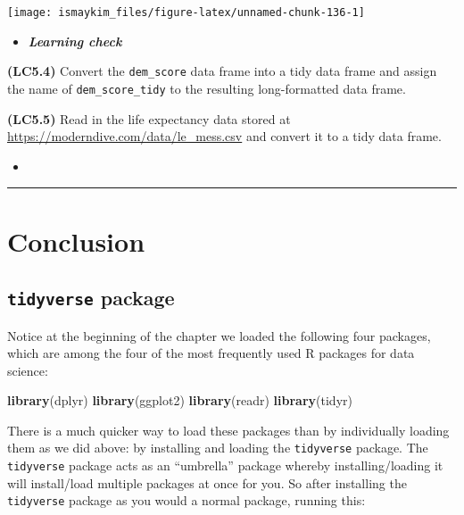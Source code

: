 \documentclass[12pt, krantz2,]{krantz}
\makeatletter
\newenvironment{Shaded}{\begin{snugshade}}{\end{snugshade}}
\newcommand{\KeywordTok}[1]{\textcolor[rgb]{0.27,0.27,0.27}{\textbf{#1}}}
\newcommand{\NormalTok}[1]{#1}
\newenvironment{kframe}{%
\medskip{}
\setlength{\fboxsep}{.8em}
 \def\at@end@of@kframe{}%
 \ifinner\ifhmode%
  \def\at@end@of@kframe{\end{minipage}}%
  \begin{minipage}{\columnwidth}%
 \fi\fi%
 \def\FrameCommand##1{\hskip\@totalleftmargin \hskip-\fboxsep
 \colorbox{shadecolor}{##1}\hskip-\fboxsep
     \hskip-\linewidth \hskip-\@totalleftmargin \hskip\columnwidth}%
 \MakeFramed {\advance\hsize-\width
   \@totalleftmargin\z@ \linewidth\hsize
   \@setminipage}}%
 {\par\unskip\endMakeFramed%
 \at@end@of@kframe}
\renewenvironment{Shaded}{\begin{kframe}}{\end{kframe}}
\newenvironment{rmdblock}[1]
  {\begin{shaded*}
  \begin{itemize}
  \renewcommand{\labelitemi}{
    \raisebox{-.7\height}[0pt][0pt]{
    }
  }
  \item
  }
  {
  \end{itemize}
  \end{shaded*}
  }
\newenvironment{learncheck}
  {\begin{rmdblock}{warning}}
  {\end{rmdblock}}
\makeatother
\begin{document}
\begin{center}\texttt{[image: ismaykim\_files/figure-latex/unnamed-chunk-136-1]} \end{center}

\begin{learncheck}
\textbf{\emph{Learning check}}
\end{learncheck}

\textbf{(LC5.4)} Convert the \texttt{dem\_score} data frame into
a tidy data frame and assign the name of \texttt{dem\_score\_tidy} to the resulting long-formatted data frame.

\textbf{(LC5.5)} Read in the life expectancy data stored at \url{https://moderndive.com/data/le_mess.csv} and convert it to a tidy data frame.

\begin{learncheck}

\end{learncheck}

\begin{center}\rule{0.5\linewidth}{\linethickness}\end{center}

\hypertarget{conclusion-3}{%
\section{Conclusion}\label{conclusion-3}}

\hypertarget{tidyverse-package}{%
\subsection{\texorpdfstring{\texttt{tidyverse} package}{tidyverse package}}\label{tidyverse-package}}

Notice at the beginning of the chapter we loaded the following four packages, which are among the four of the most frequently used R packages for data science:

\begin{Shaded}
\begin{Highlighting}[]
\KeywordTok{library}\NormalTok{(dplyr)}
\KeywordTok{library}\NormalTok{(ggplot2)}
\KeywordTok{library}\NormalTok{(readr)}
\KeywordTok{library}\NormalTok{(tidyr)}
\end{Highlighting}
\end{Shaded}

There is a much quicker way to load these packages than by individually loading them as we did above: by installing and loading the \texttt{tidyverse} package. The \texttt{tidyverse} package acts as an ``umbrella'' package whereby installing/loading it will install/load multiple packages at once for you. So after installing the \texttt{tidyverse} package as you would a normal package, running this:
\end{document}
